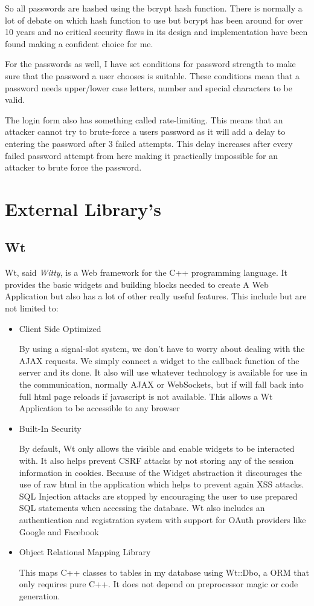 So all passwords are hashed using the bcrypt hash function. There is normally a lot of debate on which hash function to use but bcrypt has been around for over 10 years and no critical security flaws in its design and implementation have been found making a confident choice for me.

For the passwords as well, I have set conditions for password strength to make sure that the password a user chooses is suitable. These conditions mean that a password needs upper/lower case letters, number and special characters to be valid.

The login form also has something called rate-limiting. This means that an attacker cannot try to brute-force a users password as it will add a delay to entering the password after 3 failed attempts. This delay increases after every failed password attempt from here making it practically impossible for an attacker to brute force the password.

\section{External Library's}
\subsection{Wt}

Wt, said \textit{Witty}, is a Web framework for the C++ programming language. It provides the basic widgets and building blocks needed to create A Web Application but also has a lot of other really useful features. This include but are not limited to:

\begin{itemize}
\item{Client Side Optimized

By using a signal-slot system, we don't have to worry about dealing with the AJAX requests. We simply connect a widget to the callback function of the server and its done. It also will use whatever technology is available for use in the communication, normally AJAX or WebSockets, but if will fall back into full html page reloads if javascript is not available. This allows a Wt Application to be accessible to any browser}
\item{Built-In Security

By default, Wt only allows the visible and enable widgets to be interacted with. It also helps prevent CSRF attacks by not storing any of the session information in cookies. Because of the Widget abstraction it discourages the use of raw html in the application which helps to prevent again XSS attacks. SQL Injection attacks are stopped by encouraging the user to use prepared SQL statements when accessing the database. Wt also includes an authentication and registration system with support for OAuth providers like Google and Facebook}
\item{Object Relational Mapping Library

This maps C++ classes to tables in my database using Wt::Dbo, a ORM that only requires pure C++. It does not depend on preprocessor magic or code generation.}
\end{itemize}

